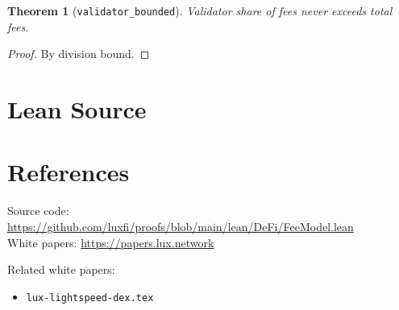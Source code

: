 \documentclass[11pt]{article}
\newtheorem{theorem}{Theorem}
\begin{document}
\begin{theorem}[\texttt{validator\_bounded}]
Validator share of fees never exceeds total fees.
\end{theorem}
\begin{proof}
By division bound.
\end{proof}


\section{Lean Source}


\section{References}
\noindent Source code: \url{https://github.com/luxfi/proofs/blob/main/lean/DeFi/FeeModel.lean}\\
\noindent White papers: \url{https://papers.lux.network}

\noindent Related white papers:
\begin{itemize}
  \item \texttt{lux-lightspeed-dex.tex}
\end{itemize}
\end{document}
